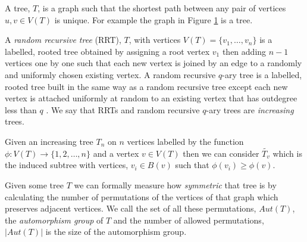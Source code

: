 \documentclass[12pt]{article} %
\theoremstyle{definition}
\begin{document}
A tree, $T$, is a graph such that the shortest path between any pair of vertices $u,v \in V(T)$ is unique.  For example the graph in Figure \ref{fig:3} is a tree. 
\begin{figure}
 \caption{}\label{fig:3}
\end{figure}

A \emph{random recursive tree} (RRT), $T$, with vertices $V(T) = \{v_{1},\dots,v_{n}\}$ is a 
labelled, rooted tree obtained by assigning a root vertex $v_{1}$ then adding $n-1$ vertices 
one by one such that each new vertex is joined by an edge to a randomly and uniformly chosen 
existing vertex. A random recursive $q$-ary tree is a labelled, rooted tree built in the same 
way as a random recursive tree except each new vertex is attached uniformly at random to an 
existing vertex that has outdegree less than $q$ \cite{varietiesofincreasintrees}.  We say that RRTs and random 
recursive $q$-ary trees are \emph{increasing} trees.  

Given an increasing tree $T_{n}$ on $n$ vertices labelled by the function 
$\phi : V(T) \rightarrow \{1,2,\dots,n\}$ and a vertex $v \in V(T)$ then we can consider 
$\tilde{T_{v}}$  which is the induced subtree with vertices, $v_{i}\in B(v)$ such that 
$\phi(v_{i}) \geq \phi(v)$. 

Given some tree $T$ we can formally measure how \emph{symmetric} that tree is by calculating 
the number of permutations of the vertices of that graph which preserves adjacent vertices.  
We call the set of all these permutations, $Aut(T)$, the \emph{automorphism group} of $T$ and 
the number of allowed permutations, $|Aut(T)|$ is the size of the automorphism group.  
\end{document}
